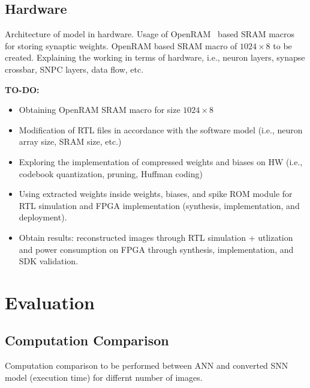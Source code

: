 \documentclass[conference]{IEEEtran}
\begin{document}
\subsection{Hardware}

 Architecture of model in hardware. Usage of OpenRAM~\cite{7827670} based SRAM macros for storing synaptic weights. OpenRAM based SRAM macro of $1024\times8$ to be created. Explaining the working in terms of hardware, i.e., neuron layers, synapse crossbar, SNPC layers, data flow, etc.

 \textbf{TO-DO:}
\begin{itemize}
\item Obtaining OpenRAM SRAM macro for size $1024\times8$
\item Modification of RTL files in accordance with the software model (i.e., neuron array size, SRAM size, etc.)
\item Exploring the implementation of compressed weights and biases on HW (i.e., codebook quantization, pruning, Huffman coding)
\item Using extracted weights inside weights, biases, and spike ROM module for RTL simulation and FPGA implementation (synthesis, implementation, and deployment).
\item Obtain results: reconstructed images through RTL simulation + utlization and power consumption on FPGA through synthesis, implementation, and SDK validation.
\end{itemize} 

\section{Evaluation}\label{sec:evaluation}

\subsection{Computation Comparison}

Computation comparison to be performed between ANN and converted SNN model (execution time) for differnt number of images.
\end{document}
